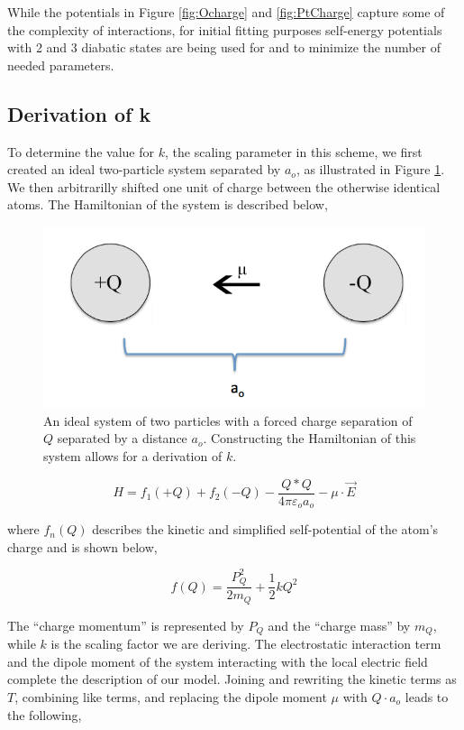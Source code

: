 While the potentials in Figure \ref{fig:Ocharge} and \ref{fig:PtCharge} capture
some of the complexity of  interactions, for initial fitting
purposes self-energy potentials with 2 and 3 diabatic states are being used for
 and  to minimize the number of needed parameters.

\subsection{Derivation of k}
To determine the value for $k$, the scaling parameter in this scheme, we first
created an ideal two-particle system separated by $a_o$, as illustrated in
Figure \ref{fig:kSketch}.  We then arbitrarilly shifted one unit of charge
between the otherwise identical atoms. The Hamiltonian of the system is
described below,

\begin{figure}
  \centering
  \includegraphics[width=0.75\linewidth]{../figures/chap5/determineK2.png}
  \caption{An ideal system of two particles with a forced charge separation of
$Q$ separated by a distance $a_o$. Constructing the Hamiltonian of this system
allows for a derivation of $k$.}
\label{fig:kSketch}
\end{figure}

\begin{equation*}
H = f_1(+Q) + f_2(-Q) - \frac{Q*Q}{4\pi\varepsilon_o a_o} - \mu\cdot\vec{E}
\end{equation*}

where $f_n(Q)$ describes the kinetic and simplified self-potential of the
atom's charge and is shown below,

\begin{equation*}
f(Q) = \frac{P_Q^2}{2m_Q} + \frac{1}{2}kQ^2
\end{equation*}

The ``charge momentum'' is represented by $P_Q$ and the ``charge mass'' by $m_Q$, while
$k$ is the scaling factor we are deriving. The electrostatic interaction term
and the dipole moment of the system interacting with the local electric field
complete the description of our model. Joining and rewriting the kinetic terms as $T$,
combining like terms, and replacing the dipole moment $\mu$ with $Q\cdot a_o$ leads to the
following,

